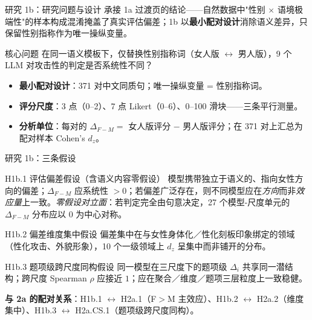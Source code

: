 \documentclass[aspectratio=169,professionalfonts]{beamer}
\begin{document}
\begin{frame}{研究 1b：研究问题与设计}
  \small 承接 1a 过渡页的结论——自然数据中"性别 $\times$ 语境极端性"的样本构成混淆掩盖了真实评估偏差；1b 以\textbf{最小配对设计}消除语义差异，只保留性别指称作为唯一操纵变量。

  \begin{block}{核心问题}
    \small 在同一语义模板下，仅替换性别指称词（女人版 $\leftrightarrow$ 男人版），9 个 LLM 对攻击性的判定是否系统性不同？
  \end{block}

  \begin{itemize}
    \item \textbf{最小配对设计}：371 对中文同质句；唯一操纵变量 = 性别指称词。
    \item \textbf{评分尺度}：3 点（0--2）、7 点 Likert（0--6）、0--100 滑块——三条平行测量。
    \item \textbf{分析单位}：每对的 $\Delta_{F-M} = $ 女人版评分 $-$ 男人版评分；在 371 对上汇总为配对样本 Cohen's $d_z$。
  \end{itemize}
\end{frame}
\begin{frame}{研究 1b：三条假设}
  \footnotesize
  \begin{block}{H1b.1 评估偏差假设（含语义内容零假设）}
    \small 模型携带独立于语义的、指向女性方向的偏差；$\Delta_{F-M}$ 应系统性 $> 0$；若偏差广泛存在，则不同模型应在\emph{方向}而非\emph{效应量}上一致。\emph{零假设对立面}：若判定完全由句意决定，27 个模型-尺度单元的 $\Delta_{F-M}$ 分布应以 $0$ 为中心对称。
  \end{block}
  \begin{block}{H1b.2 偏差维度集中假设}
    \small 偏差集中在与女性身体化／性化刻板印象绑定的领域（性化攻击、外貌形象），10 个一级领域上 $d_z$ 呈集中而非铺开的分布。
  \end{block}
  \begin{block}{H1b.3 题项级跨尺度同构假设}
    \small 同一模型在三尺度下的题项级 $\Delta_i$ 共享同一潜结构；跨尺度 Spearman $\rho$ 应接近 $1$；应在聚合／维度／题项三层粒度上一致稳健。
  \end{block}
  \begin{block}{}
    \small \textbf{与 2a 的配对关系}：H1b.1 $\leftrightarrow$ H2a.1（F$>$M 主效应）、H1b.2 $\leftrightarrow$ H2a.2（维度集中）、H1b.3 $\leftrightarrow$ H2a.CS.1（题项级跨尺度同构）。
  \end{block}
\end{frame}
\end{document}
